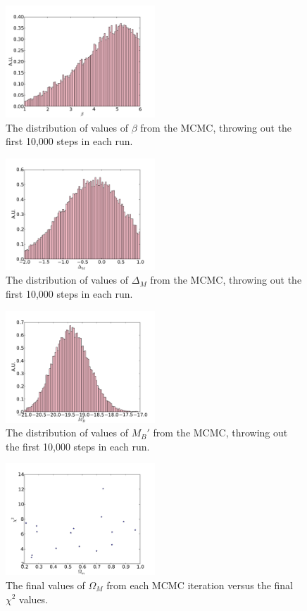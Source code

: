 \documentclass[aps,prl,reprint]{revtex4-1}
\begin{document}
\begin{figure}
 \includegraphics[width=0.5\textwidth]{../plots/beta_hist.pdf}
\caption{\label{fig:betahist}The distribution of values of $\beta$ from the MCMC, throwing out the first 10,000 steps in each run.}
\end{figure}
\begin{figure}
 \includegraphics[width=0.5\textwidth]{../plots/dM_hist.pdf}
\caption{\label{fig:dMhist}The distribution of values of $\Delta_M$ from the MCMC, throwing out the first 10,000 steps in each run.}
\end{figure}
\begin{figure}
 \includegraphics[width=0.5\textwidth]{../plots/Mp_hist.pdf}
\caption{\label{fig:Mphist}The distribution of values of $M_B'$ from the MCMC, throwing out the first 10,000 steps in each run.}
\end{figure}
\begin{figure}
 \includegraphics[width=0.5\textwidth]{../plots/om_chi.pdf}
\caption{\label{fig:chi2}The final values of $\Omega_M$ from each MCMC iteration versus the final $\chi^2$ values.}
\end{figure}
\end{document}
